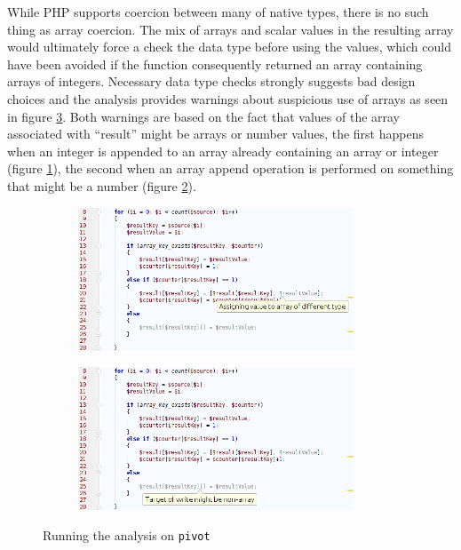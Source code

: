While PHP supports coercion between many of native types, there is no such thing as array coercion. The mix of arrays and scalar values in the resulting array would ultimately force a check the data type before using the values, which could have been avoided if the function consequently returned an array containing arrays of integers. Necessary data type checks strongly suggests bad design choices and the analysis provides warnings about suspicious use of arrays as seen in figure \ref{fig:pivotScreenshot}. Both warnings are based on the fact that values of the array associated with ``result'' might be arrays or number values, the first happens when an integer is appended to an array already containing an array or integer (figure \ref{fig:pivotScreenshot1}), the second when an array append operation is performed on something that might be a number (figure \ref{fig:pivotScreenshot2}). 

\begin{figure}
\centering
\begin{subfigure}{\textwidth}
\centering
\includegraphics[width=0.9\textwidth]{chapters/caseStudy/screens/pivot1}
\label{fig:pivotScreenshot1}
\end{subfigure}
\begin{subfigure}{\textwidth}
\centering
\includegraphics[width=0.9\textwidth]{chapters/caseStudy/screens/pivot2}
\label{fig:pivotScreenshot2}
\end{subfigure}
\caption{Running the analysis on \texttt{pivot}}
\label{fig:pivotScreenshot}
\end{figure}

